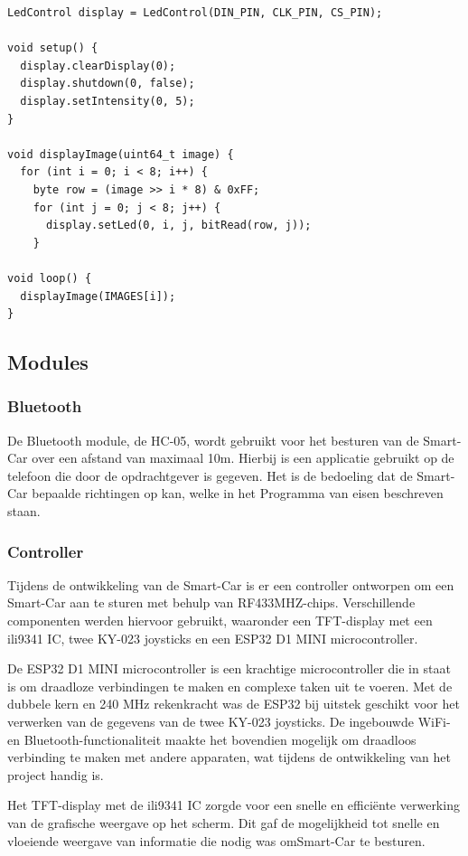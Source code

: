 \begin{enumerate}
\begin{lstlisting}
LedControl display = LedControl(DIN_PIN, CLK_PIN, CS_PIN);

void setup() {
  display.clearDisplay(0);
  display.shutdown(0, false);
  display.setIntensity(0, 5);
}

void displayImage(uint64_t image) {
  for (int i = 0; i < 8; i++) {
    byte row = (image >> i * 8) & 0xFF;
    for (int j = 0; j < 8; j++) {
      display.setLed(0, i, j, bitRead(row, j));
    }
    
void loop() {
  displayImage(IMAGES[i]);
}
    \end{lstlisting}
\end{enumerate}

\subsection{Modules}
\subsubsection{Bluetooth}
De \gls{Bluetooth} module, de HC-05, wordt gebruikt voor het besturen van de \gls{Smart-Car} over een afstand van maximaal 10m. Hierbij is een applicatie gebruikt op de telefoon die door de opdrachtgever is gegeven. Het is de bedoeling dat de \gls{Smart-Car} bepaalde richtingen op kan, welke in het Programma van eisen beschreven staan. 
\subsubsection{Controller}
Tijdens de ontwikkeling van de \gls{Smart-Car} is er een controller ontworpen om een \gls{Smart-Car} aan te sturen met behulp van \gls{RF433MHZ}-chips. Verschillende componenten werden hiervoor gebruikt, waaronder een \gls{TFT-display} met een \gls{ili9341}\cite{ILI3941} IC, twee KY-023 joysticks en een ESP32\cite{ESP32} D1 MINI \gls{microcontroller}.

De ESP32\cite{ESP32} D1 MINI \gls{microcontroller} is een krachtige \gls{microcontroller} die in staat is om draadloze verbindingen te maken en complexe taken uit te voeren. Met de dubbele kern en 240 MHz rekenkracht was de ESP32\cite{ESP32} bij uitstek geschikt voor het verwerken van de gegevens van de twee KY-023 joysticks. De ingebouwde WiFi- en \gls{Bluetooth}-functionaliteit maakte het bovendien mogelijk om draadloos verbinding te maken met andere apparaten, wat tijdens de ontwikkeling van het project handig is.

Het \gls{TFT-display} met de \gls{ili9341}\cite{ILI3941} IC zorgde voor een snelle en efficiënte verwerking van de grafische weergave op het scherm. Dit gaf de mogelijkheid tot snelle en vloeiende weergave van informatie die nodig was om\gls{Smart-Car} te besturen.

